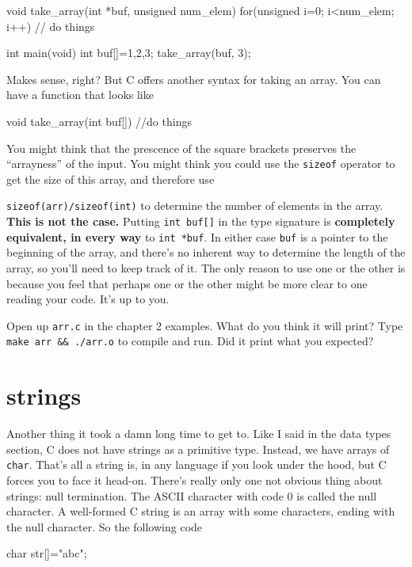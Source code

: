 \documentclass[ebook,11pt,oneside,openany]{memoir}
\newcommand{\cf}[1]{\texttt{#1}}
\begin{document}
\begin{code}[language=C]
void take_array(int *buf, unsigned num_elem) 
{
  for(unsigned i=0; i<num_elem; i++) {
    // do things
  }
}

int main(void)
{
  int buf[]={1,2,3};
  take_array(buf, 3);
}
\end{code}

\noindent
Makes sense, right? But C offers another syntax for taking an array. You can have a function that looks like

\begin{code}[language=C]
void take_array(int buf[])
{
  //do things
}
\end{code}

You might think that the prescence of the square brackets preserves the ``arrayness'' of the input. You might think you could use the \cf{sizeof} operator to get the size of this array, and therefore use 

\noindent
\cf{sizeof(arr)/sizeof(int)} to determine the number of elements in the array. \textbf{This is not the case.} Putting \cf{int buf[]} in the type signature is \textbf{completely equivalent, in every way} to \cf{int *buf}. In either case \cf{buf} is a pointer to the beginning of the array, and there's no inherent way to determine the length of the array, so you'll need to keep track of it. The only reason to use one or the other is because you feel that perhaps one or the other might be more clear to one reading your code. It's up to you.

Open up \cf{arr.c} in the chapter 2 examples. What do you think it will print? Type \cf{make arr \&\& ./arr.o} to compile and run. Did it print what you expected?

\section{strings}

Another thing it took a damn long time to get to. Like I said in the data types section, C does not have strings as a primitive type. Instead, we have arrays of \texttt{char}. That's all a string is, in any language if you look under the hood, but C forces you to face it head-on. There's really only one not obvious thing about strings: null termination. The ASCII character with code 0 is called the null character. A well-formed C string is an array with some characters, ending with the null character. So the following code

\begin{code}[language=C]
char str[]="abc";
\end{code}
\end{document}
